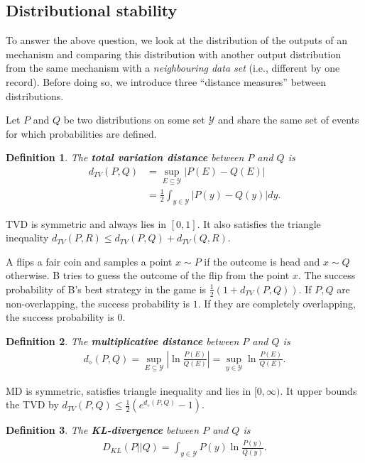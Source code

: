 \documentclass[]{article}
\newtheorem{definition}{Definition}[section] %
\begin{document}
\subsection{Distributional stability}
To answer the above question, we look at the distribution of the outputs of an mechanism and comparing this distribution with another output distribution from the same mechanism with a \textit{neighbouring data set} (i.e., different by one record). Before doing so, we introduce three ``distance measures'' between distributions. 

Let $P$ and $Q$ be two distributions on some set $\mathcal{Y}$ and share the same set of events for which probabilities are defined. 
\begin{definition}
	The \textbf{total variation distance} between $P$ and $Q$ is 
	\begin{align*}
		d_{TV}(P,Q) &= \sup_{E \subseteq \mathcal{Y}} |P(E) - Q(E)| \\
		&= \frac{1}{2}\int_{y \in \mathcal{Y}} |P(y)-Q(y)| dy.
	\end{align*}
\end{definition}

TVD is symmetric and always lies in $[0,1]$. It also satisfies the triangle inequality $d_{TV}(P,R) \le d_{TV}(P,Q) + d_{TV}(Q,R)$. 

A flips a fair coin and samples a point $x \sim P$ if the outcome is head and $x \sim Q$ otherwise. B tries to guess the outcome of the flip from the point $x$. The success probability of B's best strategy in the game is $\frac{1}{2}(1+d_{TV}(P,Q))$. If $P,Q$ are non-overlapping, the success probability is $1$. If they are completely overlapping, the success probability is $0$. 

\begin{definition}
	The \textbf{multiplicative distance} between $P$ and $Q$ is 
	\begin{align*}
		d_{\diamond}(P,Q) = \sup_{E\subseteq \mathcal{Y}} \left|\ln \frac{P(E)}{Q(E)} \right| 
		= \sup_{y \in \mathcal{Y}} \ln \frac{P(E)}{Q(E)}.
	\end{align*}
\end{definition}
MD is symmetric, satisfies triangle inequality and lies in $[0,\infty)$. It upper bounds the TVD by $d_{TV}(P,Q) \le \frac{1}{2}\left(e^{d_{\diamond}(P,Q)} - 1 \right)$. 

\begin{definition}
	The \textbf{KL-divergence} between $P$ and $Q$ is 
	\begin{align*}
		D_{KL}(P || Q) = \int_{y \in \mathcal{Y}} P(y) \ln \frac{P(y)}{Q(y)}.
	\end{align*}
\end{definition}
\end{document}
